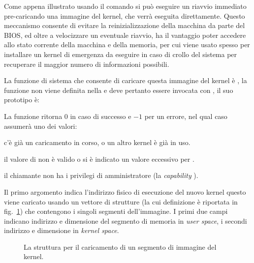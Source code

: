 Come appena illustrato usando il comando  si
può eseguire un riavvio immediato pre-caricando una immagine del kernel, che
verrà eseguita direttamente. Questo meccanismo consente di evitare la
reinizializzazione della macchina da parte del BIOS, ed oltre a velocizzare un
eventuale riavvio, ha il vantaggio poter accedere allo stato corrente della
macchina e della memoria, per cui viene usato spesso per installare un kernel
di emergenza da eseguire in caso di crollo del sistema per recuperare il
maggior numero di informazioni possibili.

La funzione di sistema che consente di caricare questa immagine del kernel è
, la funzione non viene definita nella  e deve
pertanto essere invocata con , il suo prototipo è:

\begin{funcproto}{

}

{La funzione ritorna $0$ in caso di successo e $-1$ per un errore, nel qual
  caso  assumerà uno dei valori:
  \begin{errlist}
  \item[\errcode{EBUSY}] c'è già un caricamento in corso, o un altro kernel è
    già in uso.
  \item[\errcode{EINVAL}] il valore di  non è valido o si è
    indicato un valore eccessivo per .
  \item[\errcode{EPERM}] il chiamante non ha i privilegi di amministratore (la
    \textit{capability} ).
  \end{errlist}
}  
\end{funcproto}

Il primo argomento indica l'indirizzo fisico di esecuzione del nuovo kernel
questo viene caricato usando un vettore di strutture 
(la cui definizione è riportata in fig.~\ref{fig:kexec_segment}) che
contengono i singoli segmenti dell'immagine. I primi due campi indicano
indirizzo e dimensione del segmento di memoria in \textit{user space}, i
secondi indirizzo e dimensione in \textit{kernel space}. 


\begin{figure}[!htb]
  \footnotesize
  \centering
  \begin{minipage}[c]{0.8\textwidth}
  \end{minipage} 
  \normalsize 
  \caption{La struttura  per il caricamento di un
    segmento di immagine del kernel.}
  \label{fig:kexec_segment}
\end{figure}

